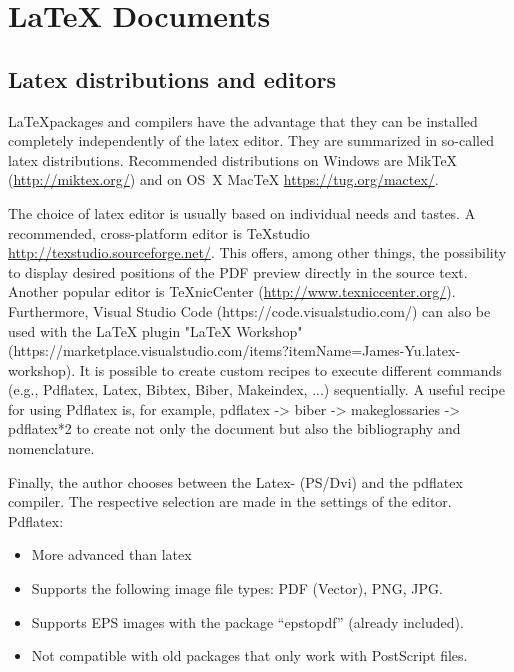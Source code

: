 \chapter[LaTeX ]{LaTeX Documents}

\section{Latex distributions and editors}

\LaTeX packages and compilers have the advantage that they can be installed completely independently of the latex editor.
They are summarized in so-called latex distributions.
Recommended distributions on Windows are MikTeX (\href{http://miktex.org/}{http://miktex.org/}) and on OS~X MacTeX \href{https://tug.org/mactex/}{https://tug.org/mactex/}.

The choice of latex editor is usually based on individual needs and tastes.
A recommended, cross-platform editor is TeXstudio \href{http://texstudio.sourceforge.net/}{http://texstudio.sourceforge.net/}.
This offers, among other things, the possibility to display desired positions of the PDF preview directly in the source text.
Another popular editor is TeXnicCenter (\href{http://www.texniccenter.org/}{http://www.texniccenter.org/}).
Furthermore, Visual Studio Code (https://code.visualstudio.com/) can also be used with the LaTeX plugin "LaTeX Workshop" (https://marketplace.visualstudio.com/items?itemName=James-Yu.latex-workshop). It is possible to create custom recipes to execute different commands (e.g., Pdflatex, Latex, Bibtex, Biber, Makeindex, ...) sequentially. A useful recipe for using Pdflatex is, for example, pdflatex -> biber -> makeglossaries -> pdflatex*2 to create not only the document but also the bibliography and nomenclature.

Finally, the author chooses between the Latex- (PS/Dvi) and the pdflatex compiler.
The respective selection are made in the settings of the editor. \\

Pdflatex:
\begin{itemize}
	\item More advanced than latex
	\item Supports the following image file types: PDF (Vector), PNG, JPG.
	\item Supports EPS images with the package "`epstopdf"' (already included).
	\item Not compatible with old packages that only work with PostScript files.
\end{itemize}

